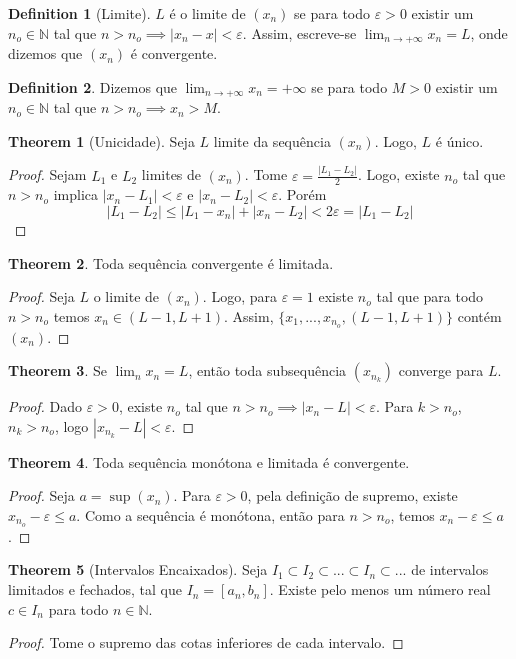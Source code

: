 \documentclass[10pt]{article}
\theoremstyle{definition}
\newtheorem{definition}{Definition}[section]
\newtheorem{theorem}{Theorem}
\begin{document}
\begin{definition}[Limite]
	$L$ é o limite de $(x_n)$ se para todo $\varepsilon > 0$ existir um
	$n_o \in \mathbb N$ tal que $n>n_o \implies |x_n - x| < \varepsilon$.
	Assim, escreve-se $\lim_{n\to +\infty} x_n = L$, onde dizemos que
	$(x_n)$ é convergente.
\end{definition}

\begin{definition}
	Dizemos que $\lim_{n \to +\infty} x_n = +\infty$ se
	para todo $M > 0$ existir um $n_o \in \mathbb N$ tal que
	$n > n_o \implies x_n > M$.
\end{definition}

\begin{theorem}[Unicidade]
	Seja $L$ limite da sequência $(x_n)$. Logo, $L$ é único.
\end{theorem}
\begin{proof}
	Sejam $L_1$ e $L_2$ limites de $(x_n)$. Tome $\varepsilon = \frac{|L_1-L_2|}{2}$.
	Logo, existe $n_o$ tal que $n>n_o$ implica $|x_n - L_1|<\varepsilon$ e
	$|x_n - L_2|<\varepsilon$. Porém
	\begin{equation}
		|L_1-L_2|\leq |L_1 - x_n| + |x_n - L_2| < 2\varepsilon = |L_1 - L_2|
	\end{equation}
\end{proof}
\begin{theorem}
	Toda sequência convergente é limitada.	
\end{theorem}
\begin{proof}
	Seja $L$ o limite de $(x_n)$. Logo, para $\varepsilon = 1$ existe
	$n_o$ tal que para todo $n > n_o$ temos $x_n \in (L-1,L+1)$.
	Assim, $\{x_1,...,x_{n_o},(L-1,L+1)\}$ contém $(x_n)$.
\end{proof}
\begin{theorem}
	Se $\lim_n x_n = L$, então toda subsequência $(x_{n_k})$ converge para $L$.
\end{theorem}
\begin{proof}
	Dado $\varepsilon > 0$, existe $n_o$ tal que $n>n_o \implies
	|x_n - L| < \varepsilon$. Para $k>n_o$, $n_k > n_o$, logo
	$|x_{n_k} - L| < \varepsilon$.
\end{proof}

\begin{theorem}
	Toda sequência monótona e limitada é convergente.
\end{theorem}
\begin{proof}
	Seja $a = \sup (x_n)$. Para $\varepsilon > 0$, pela definição de supremo,
	existe $x_{n_o} - \varepsilon \leq a$. Como a sequência é monótona, então
	para $n>n_o$, temos $x_n - \varepsilon \leq a$.
\end{proof}
\begin{theorem}[Intervalos Encaixados]
	Seja $I_1 \subset I_2 \subset ... \subset I_n \subset ...$ de intervalos limitados e fechados,
	tal que $I_n = [a_n,b_n]$. Existe pelo menos um número real $c \in I_n$ para todo $n \in \mathbb N$.
\end{theorem}
\begin{proof}
	Tome o supremo das cotas inferiores de cada intervalo. 
\end{proof}
\end{document}
